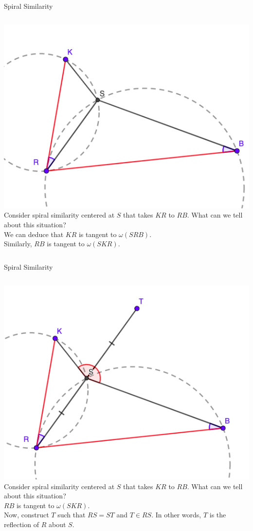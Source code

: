 \documentclass{beamer}
\begin{document}
\begin{frame}{Spiral Similarity}
	\begin{columns}
		\includegraphics[scale=0.34]{spi4.png}
		Consider spiral similarity centered at $S$ that takes
		$KR$ to $RB$. What can we tell about this situation?\\
		\phantom{Spacing}
		We can deduce that $KR$ is tangent to $\omega(SRB)$.\\
		Similarly, $RB$ is tangent to $\omega(SKR)$.
	\end{columns}
\end{frame}
\begin{frame}{Spiral Similarity}
	\begin{columns}
		\column{0.6\textwidth}
		\includegraphics[scale=0.34]{spi5.png}
		\column{0.4\textwidth}
		Consider spiral similarity centered at $S$ that takes
		$KR$ to $RB$. What can we tell about this situation?\\
		$RB$ is tangent to $\omega(SKR)$.\\
		\phantom{Spacing}
		Now, construct $T$ such that $RS = ST$ and $T\in RS$.
		In other words, $T$ is the reflection of $R$ about $S$.
	\end{columns}
\end{frame}
\end{document}
